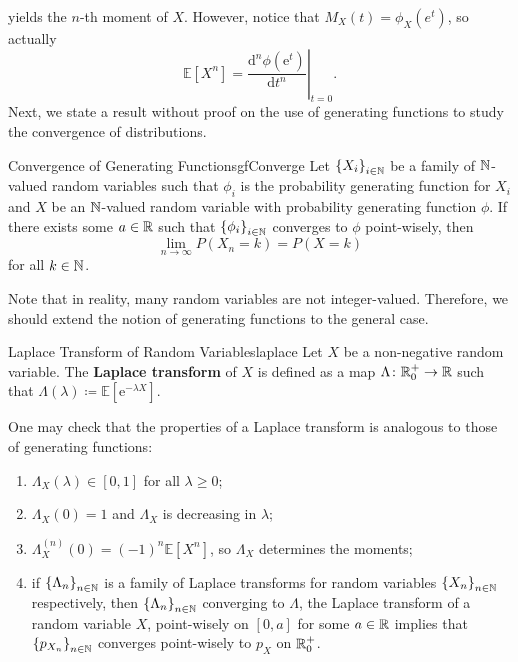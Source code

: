 \documentclass[math, code]{amznotes}
\theoremstyle{remark}
\newcommand{\e}{\mathrm{e}}
\renewcommand{\d}{\mathrm{d}}
\begin{document}
yields the $n$-th moment of $X$. However, notice that $M_X\left(t\right) = \phi_X\left(e^t\right)$, so actually 
\begin{equation*}
    \mathbb{E}\left[X^n\right] = \left.\frac{\d^n\phi\left(\e^t\right)}{\d t^n}\right\rvert_{t = 0}.
\end{equation*}
Next, we state a result without proof on the use of generating functions to study the convergence of distributions.
\begin{probox}{Convergence of Generating Functions}{gfConverge}
    Let $\left\{X_i\right\}_{i \in \mathbb{N}}$ be a family of $\mathbb{N}$-valued random variables such that $\phi_i$ is the probability generating function for $X_i$ and $X$ be an $\mathbb{N}$-valued random variable with probability generating function $\phi$. If there exists some $a \in \mathbb{R}$ such that $\left\{\phi_i\right\}_{i \in \mathbb{N}}$ converges to $\phi$ point-wisely, then 
    \begin{equation*}
        \lim_{n \to \infty}P\left(X_n = k\right) = P\left(X = k\right)
    \end{equation*}
    for all $k \in \mathbb{N}$.
\end{probox}
Note that in reality, many random variables are not integer-valued. Therefore, we should extend the notion of generating functions to the general case.
\begin{dfnbox}{Laplace Transform of Random Variables}{laplace}
    Let $X$ be a non-negative random variable. The {\color{red} \textbf{Laplace transform}} of $X$ is defined as a map $\Lambda \colon \mathbb{R}^+_0 \to \mathbb{R}$ such that $\Lambda\left(\lambda\right) \coloneqq \mathbb{E}\left[\e^{-\lambda X}\right]$.  
\end{dfnbox}
One may check that the properties of a Laplace transform is analogous to those of generating functions:
\begin{enumerate}
    \item $\Lambda_X\left(\lambda\right) \in \left[0, 1\right]$ for all $\lambda \geq 0$;
    \item $\Lambda_X\left(0\right) = 1$ and $\Lambda_X$ is decreasing in $\lambda$;
    \item $\Lambda^{(n)}_X\left(0\right) = \left(-1\right)^n\mathbb{E}\left[X^n\right]$, so $\Lambda_X$ determines the moments;
    \item if $\left\{\Lambda_n\right\}_{n \in \mathbb{N}}$ is a family of Laplace transforms for random variables $\left\{X_n\right\}_{n \in \mathbb{N}}$ respectively, then $\left\{\Lambda_n\right\}_{n \in \mathbb{N}}$ converging to $\Lambda$, the Laplace transform of a random variable $X$, point-wisely on $\left[0, a\right]$ for some $a \in \mathbb{R}$ implies that $\left\{p_{X_n}\right\}_{n \in \mathbb{N}}$ converges point-wisely to $p_X$ on $\mathbb{R}^+_0$.
\end{enumerate}
\end{document}
